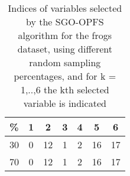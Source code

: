 \begin{table}
	\begin{center}
		\begin{tabular}{c c c c c c c}
			\% & 1 & 2 & 3 & 4 & 5 & 6 \\
			\hline
			30 & 0 & 12 & 1 & 2 & 16 & 17 \\
			70 & 0 & 12 & 1 & 2 & 16 & 17 \\
		\end{tabular}
	\end{center}
	\caption{Indices of variables selected by the SGO-OPFS algorithm for the frogs dataset, using different random sampling percentages, and for k = 1,..,6 the kth selected variable is indicated}
\end{table}